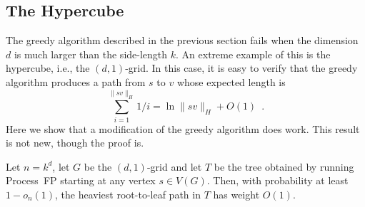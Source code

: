 \documentclass[lotsofwhite]{patmorin}
\begin{document}
\subsection{The Hypercube}

The greedy algorithm described in the previous section fails when the
dimension $d$ is much larger than the side-length $k$.  An extreme
example of this is the hypercube, i.e., the $(d,1)$-grid.  In this case,
it is easy to verify that the greedy algorithm produces a path from $s$
to $v$ whose expected length is
\[
    \sum_{i=1}^{\|sv\|_H} 1/i = \ln \|sv\|_H + O(1) \enspace . 
\]
Here we show that a modification of the greedy algorithm does work.
This result is not new, though the proof is.

\begin{thm}
  Let $n=k^d$, let $G$ be the $(d,1)$-grid and let $T$ be the tree obtained
  by running Process~FP starting at any vertex $s\in V(G)$.  Then,
  with probability at least $1-o_n(1)$, the heaviest root-to-leaf path
  in $T$ has weight $O(1)$.
\end{thm}
\end{document}
